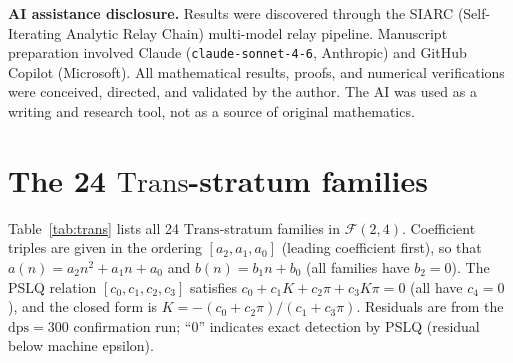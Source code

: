 \documentclass[12pt, reqno]{amsart}
\theoremstyle{definition}
\theoremstyle{remark}
\newcommand{\Trans}{\mathrm{Trans}}
\begin{document}
\medskip
\noindent\textbf{AI assistance disclosure.}
Results were discovered through the SIARC
(Self-Iterating Analytic Relay Chain) multi-model
relay pipeline. Manuscript preparation involved
Claude (\texttt{claude-sonnet-4-6}, Anthropic)
and GitHub Copilot (Microsoft). All mathematical
results, proofs, and numerical verifications were
conceived, directed, and validated by the author.
The AI was used as a writing and research tool,
not as a source of original mathematics.


\appendix
\section{The 24 $\Trans$-stratum families}\label{app:trans}

Table~\ref{tab:trans} lists all 24 $\Trans$-stratum families in $\mathcal{F}(2,4)$.
Coefficient triples are given in the ordering $[a_2, a_1, a_0]$ (leading
coefficient first), so that $a(n) = a_2 n^2 + a_1 n + a_0$ and
$b(n) = b_1 n + b_0$ (all families have $b_2 = 0$).
The PSLQ relation $[c_0, c_1, c_2, c_3]$ satisfies
$c_0 + c_1 K + c_2\pi + c_3 K\pi = 0$ (all have $c_4 = 0$),
and the closed form is $K = -(c_0 + c_2\pi)/(c_1 + c_3\pi)$.
Residuals are from the $\mathrm{dps}=300$ confirmation run;
``$0$'' indicates exact detection by PSLQ (residual below machine epsilon).
\end{document}
